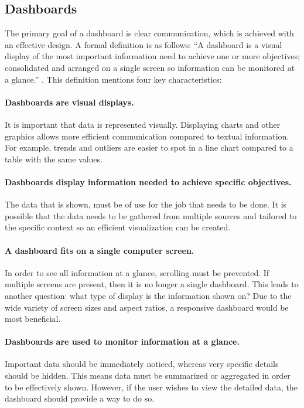     \subsection{Dashboards} \label{2_dashboards}

    The primary goal of a dashboard is clear communication, which is achieved with an effective design. A formal definition is as follows: ``A dashboard is a visual display of the most important information need to achieve one or more objectives; consolidated and arranged on a single screen so information can be monitored at a glance.'' \cite{dashboard}. This definition mentions four key characteristics:

    \paragraph{Dashboards are visual displays.} It is important that data is represented visually. Displaying charts and other graphics allows more efficient communication compared to textual information. For example, trends and outliers are easier to spot in a line chart compared to a table with the same values.

    \paragraph{Dashboards display information needed to achieve specific objectives.} The data that is shown, must be of use for the job that needs to be done. It is possible that the data needs to be gathered from multiple sources and tailored to the specific context so an efficient visualization can be created.

    \paragraph{A dashboard fits on a single computer screen.} In order to see all information at a glance, scrolling must be prevented. If multiple screens are present, then it is no longer a single dashboard. This leads to another question: what type of display is the information shown on? Due to the wide variety of screen sizes and aspect ratios, a responsive dashboard would be most beneficial.

    \paragraph{Dashboards are used to monitor information at a glance.} Important data should be immediately noticed, whereas very specific details should be hidden. This means data must be summarized or aggregated in order to be effectively shown. However, if the user wishes to view the detailed data, the dashboard should provide a way to do so.\\

